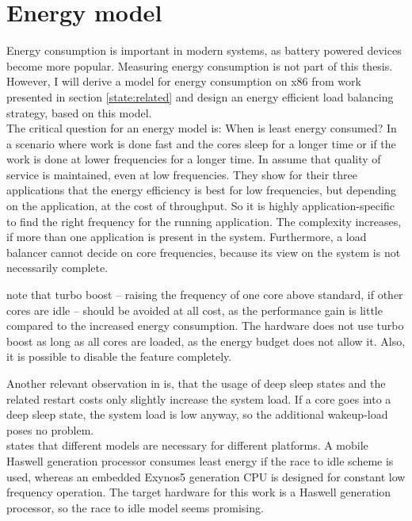\section{Energy model}
\label{design:energy}

Energy consumption is important in modern systems, as battery powered devices
become more popular.
Measuring energy consumption is not part of this thesis.
However, I will derive a model for energy consumption on x86 from work presented
in section \ref{state:related} and design an energy efficient load balancing
strategy, based on this model.
\\

The critical question for an energy model is:
When is least energy consumed?
In a scenario where work is done fast and the cores sleep for a longer time or
if the work is done at lower frequencies for a longer time.
In \cite{le_sueur_slow_2011} \citeauthor{le_sueur_slow_2011} assume that
quality of service is maintained, even at low frequencies.
They show for their three applications that the
energy efficiency is best for low frequencies, but depending on the
application, at the cost of throughput.
So it is highly application-specific to find the right frequency for the
running application.
The complexity increases, if more than one application is present in the
system.
Furthermore, a load balancer cannot decide on core frequencies, because its
view on the system is not necessarily complete.

\citeauthor{le_sueur_slow_2011} note that turbo boost -- raising the frequency
of one core above standard, if other cores are idle -- should be avoided at
all cost, as the performance gain is little compared to the increased energy
consumption.
The hardware does not use turbo boost as long as all cores are loaded, as the
energy budget does not allow it.
Also, it is possible to disable the feature completely.


Another relevant observation in \cite{le_sueur_slow_2011} is, that the usage
of deep sleep states and the related restart costs only slightly increase the
system load.
If a core goes into a deep sleep state, the system load is low anyway, so the
additional wakeup-load poses no problem.
\\

\cite{imes_poet_2015} states that different models are necessary for different
platforms.
A mobile Haswell generation processor consumes least energy if the race to
idle scheme is used, whereas an embedded Exynos5 generation CPU is designed for
constant low frequency operation.
The target hardware for this work is a Haswell generation processor, so the
race to idle model seems promising.
\\

